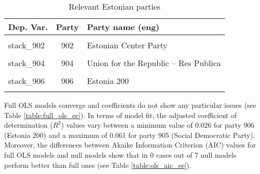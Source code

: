 \documentclass[
]{article}
\begin{document}
\begin{table}[!h]

\caption{\label{tab:unnamed-chunk-51}Relevant Estonian parties \label{table:relprty_tab_ee}}
\centering
\begin{tabular}[t]{lcl}
\toprule
Dep. Var. & Party & Party name (eng)\\
\midrule
\cellcolor{gray!6}{stack\_901} & \cellcolor{gray!6}{901} & \cellcolor{gray!6}{Estonian Reform Party}\\
stack\_902 & 902 & Estonian Center Party\\
\cellcolor{gray!6}{stack\_903} & \cellcolor{gray!6}{903} & \cellcolor{gray!6}{Conservative People's Party of Estonia}\\
stack\_904 & 904 & Union for the Republic -- Res Publica\\
\cellcolor{gray!6}{stack\_905} & \cellcolor{gray!6}{905} & \cellcolor{gray!6}{Social Democratic Party}\\
\addlinespace
stack\_906 & 906 & Estonia 200\\
\cellcolor{gray!6}{stack\_907} & \cellcolor{gray!6}{907} & \cellcolor{gray!6}{Estonian Greens}\\
\bottomrule
\end{tabular}
\end{table}

Full OLS models converge and coefficients do not show any particular issues (see Table
\ref{table:full_ols_ee}).
In terms of model fit, the adjusted coefficient of determination (\(R^2\)) values vary between
a minimum value of 0.026
for party 906
(Estonia 200)
and a maximum of 0.061
for party 905
(Social Democratic Party).
Moreover, the differences between Akaike Information Criterion (AIC) values for full OLS models and null
models show that in 0 cases out of 7 null models perform better than full ones (see Table
\ref{table:ols_aic_ee}).
\end{document}
